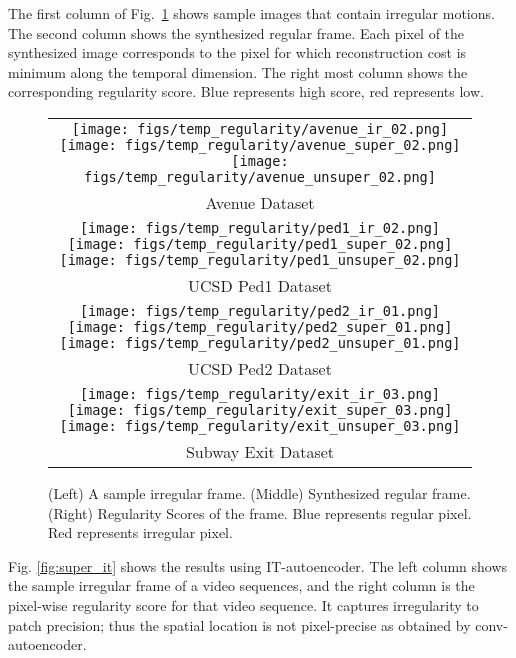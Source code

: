 \documentclass[10pt,twocolumn,letterpaper]{article}
\begin{document}
The first column of Fig.~\ref{fig:super_unsuper} shows sample images that contain irregular motions.
The second column shows the synthesized regular frame.
Each pixel of the synthesized image corresponds to the pixel for which reconstruction cost is minimum along the temporal dimension.
The right most column shows the corresponding regularity score.
Blue represents high score, red represents low.

\begin{figure}[h]
	\centering
	\begin{tabular}{c}
		\texttt{[image: figs/temp\_regularity/avenue\_ir\_02.png]}
		\texttt{[image: figs/temp\_regularity/avenue\_super\_02.png]}
		\texttt{[image: figs/temp\_regularity/avenue\_unsuper\_02.png]}\\
		{\footnotesize Avenue Dataset}\\
		\texttt{[image: figs/temp\_regularity/ped1\_ir\_02.png]}
		\texttt{[image: figs/temp\_regularity/ped1\_super\_02.png]} 
		\texttt{[image: figs/temp\_regularity/ped1\_unsuper\_02.png]} \\
		{\footnotesize UCSD Ped1 Dataset}\\
		\texttt{[image: figs/temp\_regularity/ped2\_ir\_01.png]}
		\texttt{[image: figs/temp\_regularity/ped2\_super\_01.png]}
		\texttt{[image: figs/temp\_regularity/ped2\_unsuper\_01.png]}\\
		{\footnotesize UCSD Ped2 Dataset}\\
		\texttt{[image: figs/temp\_regularity/exit\_ir\_03.png]}
		\texttt{[image: figs/temp\_regularity/exit\_super\_03.png]}
		\texttt{[image: figs/temp\_regularity/exit\_unsuper\_03.png]}\\
		{\footnotesize Subway Exit Dataset}\\		
	\end{tabular}
	\caption{(Left) A sample irregular frame. (Middle) Synthesized regular frame. (Right) Regularity Scores of the frame. Blue represents regular pixel. Red represents irregular pixel.}
	\label{fig:super_unsuper}
\end{figure}


Fig. \ref{fig:super_it} shows the results using IT-autoencoder. 
The left column shows the sample irregular frame of a video sequences, and the right column is the pixel-wise regularity score for that video sequence.
It captures irregularity to patch precision; thus the spatial location is not pixel-precise as obtained by conv-autoencoder.
\end{document}
